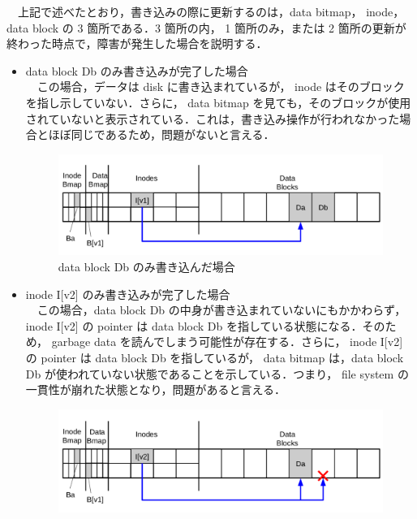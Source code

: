 \documentclass[graduation-thesis]{jsarticle}
\begin{document}
　上記で述べたとおり，書き込みの際に更新するのは，data bitmap， inode， data block の 3 箇所である．3 箇所の内， 1 箇所のみ，または 2 箇所の更新が終わった時点で，障害が発生した場合を説明する．
\begin{itemize}
	\item{data block Db のみ書き込みが完了した場合}\mbox{}\\
　この場合，データは disk に書き込まれているが， inode はそのブロックを指し示していない．さらに， data bitmap を見ても，そのブロックが使用されていないと表示されている．これは，書き込み操作が行われなかった場合とほぼ同じであるため，問題がないと言える．\\
\begin{figure}[H]
	\begin{center}
		\includegraphics[width=15.0cm,clip]{images/data3.pdf}
		\caption{data block Db のみ書き込んだ場合}
		\label{fig:data3}
	\end{center}
\end{figure}
	\item{inode I[v2] のみ書き込みが完了した場合}\\
　この場合，data block Db の中身が書き込まれていないにもかかわらず， inode I[v2] の pointer は data block Db を指している状態になる．そのため， garbage data を読んでしまう可能性が存在する．さらに， inode I[v2] の pointer は data block Db を指しているが， data bitmap は，data block Db が使われていない状態であることを示している．つまり， file system の一貫性が崩れた状態となり，問題があると言える．\\
\begin{figure}[H]
	\begin{center}
		\includegraphics[width=15.0cm,clip]{images/data4.pdf}

\end{center}
\end{figure}
\end{itemize}
\end{document}
